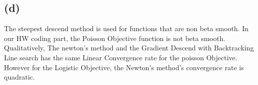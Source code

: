 \documentclass[]{article}
\begin{document}
    \subsection*{(d)}
        The steepest descend method is used for functions that are non beta smooth. In our HW coding part, the Poisson Objective function is not beta smooth. Qualitatively, The newton's method and the Gradient Descend with Backtracking Line search has the same Linear Convergence rate for the poisson Objective. However for the Logistic Objective, the Newton's method's convergence rate is quadratic. 
\end{document}

